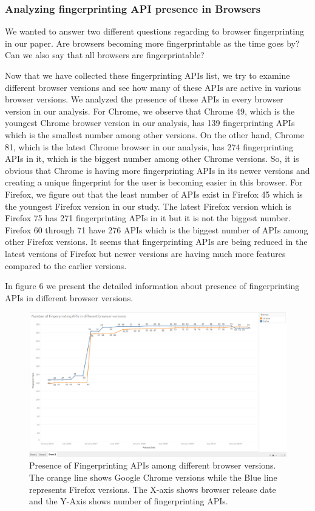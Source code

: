 



\subsubsection{Analyzing fingerprinting API presence in Browsers}
We wanted to answer two different questions regarding to browser fingerprinting in our paper. Are browsers becoming more fingerprintable as the time goes by? Can we also say that all browsers are fingerprintable?

Now that we have collected these fingerprinting APIs list, we try to examine different browser versions and see how many of these APIs are active in various browser versions.
We analyzed the presence of these APIs in every browser version in our analysis. For Chrome, we observe that Chrome 49, which is the youngest Chrome browser version in our analysis, has 139 fingerprinting APIs which is the smallest number among other versions.
On the other hand, Chrome 81, which is the latest Chrome browser in our analysis, has 274 fingerprinting APIs in it, which is the biggest number among other Chrome versions. So, it is obvious that Chrome is having more fingerprinting APIs in its newer versions and creating a unique fingerprint for the user is becoming easier in this browser. 
For Firefox, we figure out that the least number of APIs exist in Firefox 45 which is the youngest Firefox version in our study. The latest Firefox version which is Firefox 75 has 271 fingerprinting APIs in it but it is not the biggest number. Firefox 60 through 71 have 276 APIs which is the biggest number of APIs among other Firefox versions. It seems that fingerprinting APIs are being reduced in the latest versions of Firefox but newer versions are having much more features compared to the earlier versions.

In figure 6 we present the detailed information about presence of fingerprinting APIs in different browser versions.

\begin{figure}[ht]
    \centering
    \includegraphics[width=\textwidth]{figures/Fingerprinting-APIs.png}
    \caption{Presence of Fingerprinting APIs among different browser versions. The orange line shows Google Chrome versions while the Blue line represents Firefox versions. The X-axis shows browser release date and the Y-Axis shows number of fingerprinting APIs.}
    \label{fig:fingerprint-apis}
\end{figure}

